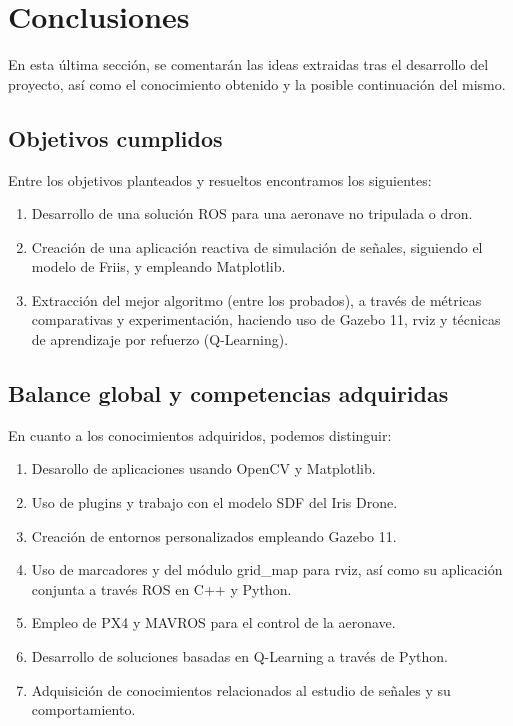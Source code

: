 \chapter{Conclusiones}
\label{cap:capitulo5}

En esta última sección, se comentarán las ideas extraidas tras el desarrollo del proyecto, así como el conocimiento obtenido y la posible continuación del mismo.

\section{Objetivos cumplidos}
\label{sec:objetivos_cumplidos}

Entre los objetivos planteados y resueltos encontramos los siguientes:

\begin{enumerate}
    \item Desarrollo de una solución \ac{ROS} para una aeronave no tripulada o dron.
    
    \item Creación de una aplicación reactiva de simulación de señales, siguiendo el modelo de Friis, y empleando Matplotlib.
    
    \item Extracción del mejor algoritmo (entre los probados), a través de métricas comparativas y experimentación, haciendo uso de Gazebo 11, rviz y técnicas de aprendizaje por refuerzo (Q-Learning).
\end{enumerate}

\section{Balance global y competencias adquiridas}
\label{sec:balance_global_competencias_adquiridas}

En cuanto a los conocimientos adquiridos, podemos distinguir:

\begin{enumerate}
    \item Desarollo de aplicaciones usando OpenCV y Matplotlib.
    
    \item Uso de plugins y trabajo con el modelo SDF del Iris Drone.
    
    \item Creación de entornos personalizados empleando Gazebo 11.
    
    \item Uso de marcadores y del módulo grid\_map para rviz, así como su aplicación conjunta a través ROS en C++ y Python.
    
    \item Empleo de PX4 y MAVROS para el control de la aeronave.
    
    \item Desarrollo de soluciones basadas en Q-Learning a través de Python.
    
    \item Adquisición de conocimientos relacionados al estudio de señales y su comportamiento.
\end{enumerate}

